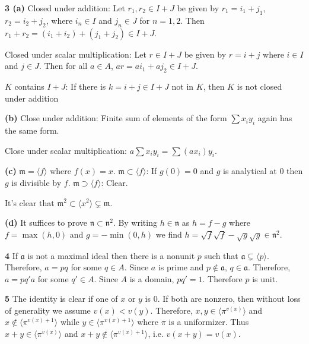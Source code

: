 \documentclass{article}
\makeatletter
\newcommand*{\shifttext}[1]{%
  \settowidth{\@tempdima}{#1}%
  \hspace{-\@tempdima}#1%
}
\newcommand{\plabel}[1]{%
\shifttext{\textbf{#1}\quad}%
}
\makeatother
\begin{document}
\plabel{3 (a)}%
Closed under addition: Let $r_1,r_2\in I+J$ be given by $r_1 = i_1 + j_1$, $r_2 = i_2+j_2$, where $i_n \in I$ and $j_n\in J$ for $n=1,2$.
Then $r_1 + r_2 = (i_1+i_2) + (j_1+j_2) \in I+J$.
\par
Closed under scalar multiplication: Let $r\in I+J$ be given by $r=i+j$ where $i\in I$ and $j\in J$.
Then for all $a\in A$, $ar = ai_1 + aj_2 \in I+J$.
\par
$K$ contains $I+J$: If there is $k = i+j\in I+J$ not in $K$, then $K$ is not closed under addition

\plabel{(b)}%
Close under addition: Finite sum of elements of the form $\sum x_i y_i$ again has the same form.
\par
Close under scalar multiplication: $a\sum x_i y_i = \sum (ax_i) y_i$.

\plabel{(c)}%
$\mathfrak{m} = \langle f \rangle$ where $f(x) = x$.
$\mathfrak{m} \subset \langle f \rangle$:
If $g(0)=0$ and $g$ is analytical at $0$ then $g$ is divisible by $f$.
$\mathfrak{m} \supset \langle f \rangle$: Clear.
\par
It's clear that $\mathfrak{m}^2 \subset \langle x^2 \rangle \subsetneq \mathfrak{m}$.

\plabel{(d)}%
It suffices to prove $\mathfrak{n} \subset \mathfrak{n}^2$.
By writing $h\in \mathfrak{n}$ as $h = f - g$ where $f = \max(h,0)$ and $g = -\min(0,h)$ we find $h = \sqrt{f}\sqrt{f} - \sqrt{g}\sqrt{g}\in \mathfrak{n}^2$.

\plabel{4}%
If $\mathfrak{a}$ is not a maximal ideal then there is a nonunit $p$ such that $\mathfrak{a} \subsetneq \langle p \rangle$.
Therefore, $a = pq$ for some $q\in A$.
Since $a$ is prime and $p\notin \mathfrak{a}$, $q\in \mathfrak{a}$.
Therefore, $a = p q' a$ for some $q'\in A$.
Since $A$ is a domain, $pq' = 1$.
Therefore $p$ is unit.

\plabel{5}%
The identity is clear if one of $x$ or $y$ is $0$.
If both are nonzero, then without loss of generality we assume $v(x) < v(y)$.
Therefore, $x,y\in \langle \pi^{v(x)} \rangle$ and $x\notin \langle \pi^{v(x)+1} \rangle$ while $y\in\langle \pi^{v(x)+1} \rangle$ where $\pi$ is a uniformizer.
Thus $x+y\in \langle \pi^{v(x)} \rangle$ and $x+y\notin \langle \pi^{v(x)+1} \rangle$, i.e. $v(x+y) = v(x)$.
\end{document}
